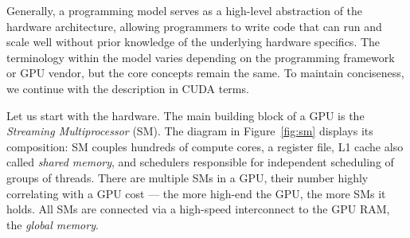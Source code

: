 Generally, a programming model serves as a high-level abstraction of the hardware architecture, allowing programmers to write code that can run and scale well without prior knowledge of the underlying hardware specifics. The terminology within the model varies depending on the programming framework or GPU vendor, but the core concepts remain the same. To maintain conciseness, we continue with the description in CUDA terms.

Let us start with the hardware. The main building block of a GPU is the \emph{Streaming Multiprocessor} (SM). The diagram in Figure~\ref{fig:sm} displays its composition: SM couples hundreds of compute cores, a register file, L1 cache also called \emph{shared memory}, and schedulers responsible for independent scheduling of groups of threads. There are multiple SMs in a GPU, their number highly correlating with a GPU cost --- the more high-end the GPU, the more SMs it holds. All SMs are connected via a high-speed interconnect to the GPU RAM, the \emph{global memory}.

